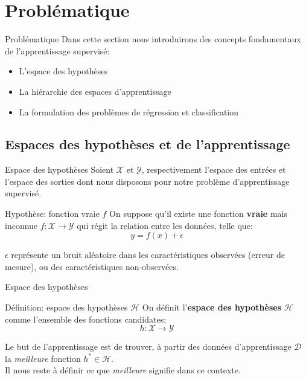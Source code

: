 \section[Problématique]{Problématique}
\begin{frame}{Problématique}
	Dans cette section nous introduirons des concepts fondamentaux de l'apprentissage supervisé:
	\begin{itemize}
		\item L'espace des hypothèses
		\item La hiérarchie des espaces d'apprentissage
		\item La formulation des problèmes de régression et classification
	\end{itemize}
\end{frame}

\subsection[Espaces]{Espaces des hypothèses et de l'apprentissage}

\begin{frame}{Espace des hypothèses}
	Soient $\mathcal{X}$ et $\mathcal{Y}$, respectivement l'espace des entrées et l'espace des sorties dont nous disposons pour notre problème d'apprentissage supervisé.
	\begin{block}{Hypothèse: fonction vraie $f$}
		On suppose qu'il existe une fonction \textbf{vraie} mais inconnue $f: \mathcal{X} \rightarrow \mathcal{Y}$ qui régit la relation entre les données, telle que:
		\begin{equation}
			y = f(x) + \epsilon
			\nonumber
		\end{equation}
		\hfill
	\end{block}
	$\epsilon$ représente un bruit aléatoire dans les caractéristiques observées (erreur de mesure), ou des caractéristiques non-observées.
\end{frame}

\begin{frame}{Espace des hypothèses}
	\begin{block}{Définition: espace des hypothèses $\mathcal{H}$}
		On définit l'\textbf{espace des hypothèses} $\mathcal{H}$ comme l'ensemble des fonctions candidates:
		\begin{equation}
			h: \mathcal{X} \rightarrow \mathcal{Y}
			\nonumber
		\end{equation}
		\hfill
	\end{block}
	Le but de l'apprentissage est de trouver, à partir des données d'apprentissage $\mathcal{D}$ la \textit{meilleure} fonction $h^* \in \mathcal{H}$. \\
	\vspace{0.5cm}
	Il nous reste à définir ce que \textit{meilleure} signifie dans ce contexte.
\end{frame}

